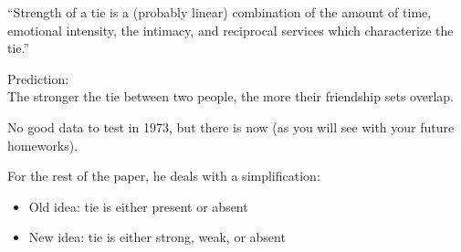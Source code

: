 \documentclass[aspectratio=169]{beamer}
\begin{document}
\begin{frame}

``Strength of a tie is a (probably linear) combination of the amount of time, emotional intensity, the intimacy, and reciprocal services which characterize the tie.''

\end{frame}
\begin{frame}

Prediction:\\
The stronger the tie between two people, the more their friendship sets overlap.

\begin{figure}
  \centering
  \hspace{0in}
\end{figure}

\vfill
No good data to test in 1973, but there is now (as you will see with your future homeworks).

\end{frame}
\begin{frame}

For the rest of the paper, he deals with a simplification:

\begin{itemize}
\item Old idea: tie is either present or absent
\item New idea: tie is either strong, weak, or absent
\end{itemize}


\end{frame}
\end{document}

